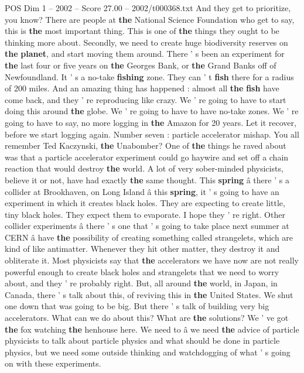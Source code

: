 \begin{textsample}{POS Dim 1 – 2002 – Score 27.00 – 2002/t000368.txt}
And they get to prioritize, you know?
There are people at \textbf{the} National Science Foundation who get to say, this is \textbf{the} most important thing.
This is one of \textbf{the} things they ought to be thinking more about.
Secondly, we need to create huge biodiversity reserves on \textbf{the} \textbf{planet}, and start moving them around.
There ' s been an experiment for \textbf{the} last four or five years on \textbf{the} Georges Bank, or \textbf{the} Grand Banks off of Newfoundland.
It ' s a no-take \textbf{fishing} zone.
They can ' t \textbf{fish} there for a radius of 200 miles.
And an amazing thing has happened : almost all \textbf{the} \textbf{fish} have come back, and they ' re reproducing like crazy.
We ' re going to have to start doing this around \textbf{the} globe.
We ' re going to have to have no-take zones.
We ' re going to have to say, no more logging in \textbf{the} Amazon for 20 years.
Let it recover, before we start logging again.
Number seven : particle accelerator mishap.
You all remember Ted Kaczynski, \textbf{the} Unabomber?
One of \textbf{the} things he raved about was that a particle accelerator experiment could go haywire and set off a chain reaction that would destroy \textbf{the} world.
A lot of very sober-minded physicists, believe it or not, have had exactly \textbf{the} same thought.
This \textbf{spring} â there ' s a collider at Brookhaven, on Long Island â this \textbf{spring}, it ' s going to have an experiment in which it creates black holes.
They are expecting to create little, tiny black holes.
They expect them to evaporate.
I hope they ' re right.
Other collider experiments â there ' s one that ' s going to take place next summer at CERN â have \textbf{the} possibility of creating something called strangelets, which are kind of like antimatter.
Whenever they hit other matter, they destroy it and obliterate it.
Most physicists say that \textbf{the} accelerators we have now are not really powerful enough to create black holes and strangelets that we need to worry about, and they ' re probably right.
But, all around \textbf{the} world, in Japan, in Canada, there ' s talk about this, of reviving this in \textbf{the} United States.
We shut one down that was going to be big.
But there ' s talk of building very big accelerators.
What can we do about this?
What are \textbf{the} solutions?
We ' ve got \textbf{the} fox watching \textbf{the} henhouse here.
We need to â we need \textbf{the} advice of particle physicists to talk about particle physics and what should be done in particle physics, but we need some outside thinking and watchdogging of what ' s going on with these experiments.

\end{textsample}
